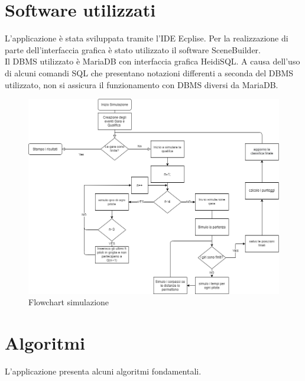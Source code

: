 \section[Software utilizzati]{Software utilizzati} %
L'applicazione è stata sviluppata tramite l'IDE Ecplise. Per la realizzazione di parte dell'interfaccia grafica è stato utilizzato il software SceneBuilder.\\
Il DBMS utilizzato è MariaDB con interfaccia grafica HeidiSQL.
A causa dell'uso di alcuni comandi SQL che presentano notazioni differenti a seconda del DBMS utilizzato, non si assicura il funzionamento con DBMS diversi da MariaDB.
\begin{figure}[h]
\centering
\includegraphics[width=1\linewidth]{images/Flowchart simulazione.png}
\caption{Flowchart simulazione}
\label{fig:Flowchart simulazione}
\end{figure}

\section[Algoritmi]{Algoritmi} %
L'applicazione presenta alcuni algoritmi fondamentali.
